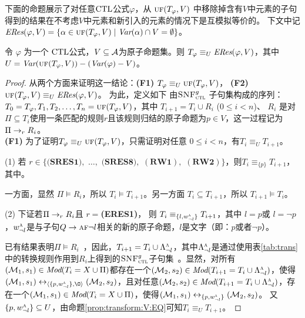 下面的命题展示了对任意$\textrm{CTL}$公式$\varphi$，从 $\textsc{uf}(T_\varphi,V)$ 中移除掉含有$V$中元素的子句得到的结果在不考虑$V$中元素和新引入的元素的情况下是互模拟等价的。
下文中记$\emph{ERes}(\varphi,V) = \{\alpha\in \textsc{uf}(T_\varphi,V)\mid \textit{Var}(\alpha)\cap V=\emptyset\}$。
\begin{proposition}\label{pro:resEQ}
	令 $\varphi$ 为一个 $\textrm{CTL}$公式，$V\subseteq\cal A$为原子命题集。则
	$T_\varphi \equiv_U\emph{ERes}(\varphi,V)$，其中  $U=\textit{Var}(\textsc{uf}(T_\varphi,V))-(\textit{Var}(\varphi)-  V)$。
\end{proposition}
\begin{proof}
	从两个方面来证明这一结论：\textbf{(F1)} $T_\varphi \equiv_U \textsc{uf}(T_\varphi,V)$， \textbf{(F2)} $\textsc{uf}(T_\varphi,V) \equiv_{U} \emph{ERes}(\varphi,V)$。
	为此，定义如下 由${\textsc{SNF}_{\textsc{ctl}}^g}$ 子句集构成的序列： $T_0=T_{\varphi}, T_1, T_2, \dots, T_n = \textsc{uf}(T_\varphi,V)$，其中
	$T_{i+1} = T_i \cup R_i$ ($0\leq i < n$)、 $R_i$ 是对$\Pi \subseteq T_i$使用一条匹配的规则$r$且该规则归结的原子命题为$p\in V$，这一过程记为 $\Pi \rightarrow_r R_i$。
	\\
	
	\textbf{(F1)} 为了证明$T_\varphi \equiv_U \textsc{uf}(T_\varphi,V)$，只需证明对任意 $0\leq i < n$，有$T_i \equiv_{U} T_{i+1}$。
	
	
	
	(1) 若 $r\in \{\textbf{(SRES1)},$ $\dots,$ $\textbf{(SRES8)},$ $(\textbf{RW1}),$ $(\textbf{RW2})\}$，则$T_i \equiv_{\{p\}} T_{i+1}$，其中。
	
	
	一方面，显然 $\Pi \models R_i$，所以 $T_i \models T_{i+1}$。另一方面 $T_i\subseteq T_{i+1}$，所以 $T_{i+1} \models T_i$。
	
	(2) 下证若$\Pi \rightarrow_r R_i$且 $r=$\textbf{(ERES1)}，
	则 $T_i \equiv_{\{l, w_{\neg l}^{\textsc{a}}\}} T_{i+1}$，其中 $l = p$或 $l = \neg p$，$w_{\neg l}^{\textsc{a}}$是与子句$Q \rightarrow \textsc{a} \textsc{f} \neg l$相关的新的原子命题，$l$是文字（即：$p$或者$\neg p$）。
	
	已有结果表明$\Pi \models R_i$~\cite{bolotov2000clausal}，因此，$T_{i+1}=T_i \cup \Lambda_{\neg l}^{\textsc{a}}$，其中$\Lambda_{\neg l}^{\textsc{a}}$是通过使用表\ref{tab:trans}中的转换规则作用到$R_i$上得到的${\textsc{SNF}_{\textsc{ctl}}^g}$子句集~\cite{zhang2009refined}。显然，对所有$({\cal M}_1,s_1) \in \textit{Mod}(T_i= X \cup \Pi)$都存在一个$({\cal M}_2, s_2)\in \textit{Mod}(T_{i+1}=T_i \cup \Lambda_{\neg l}^{\textsc{a}})$，使得$(\Hm_1, s_1) \lrto_{\tuple{\{p, w_{\neg l}^{\ALL}\}, {\O}}} (\Hm_2, s_2)$，且对任意$({\cal M}_2, s_2)\in \textit{Mod}(T_{i+1}=T_i \cup \Lambda_{\neg l}^{\textsc{a}})$，存在一个$({\cal M}_1,s_1) \in \textit{Mod}(T_i= X \cup \Pi)$，使得$({\cal M}_1, s_1) \leftrightarrow_{\{p, w_{\neg l}^{\textsc{a}}\}} ({\cal M}_2, s_2)$。
	又$\{p, w_{\neg l}^{\textsc{a}}\} \subseteq U$，由命题\ref{prop:transform:V:EQ}可知$T_i \equiv_{U} T_{i+1}$。
	

\end{proof}
